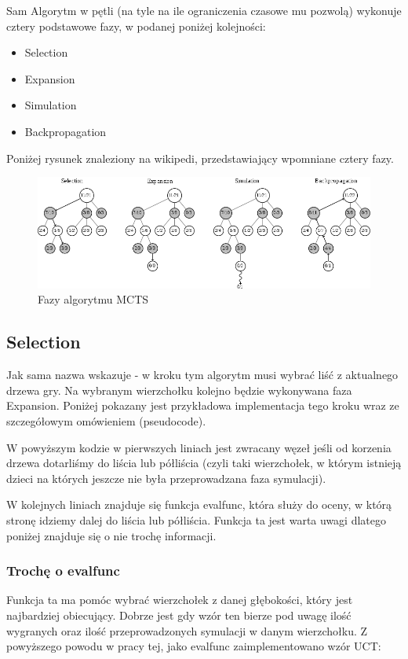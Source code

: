 \documentclass[polish,shortabstract,inz]{iithesis}
\begin{document}
Sam Algorytm w pętli (na tyle na ile ograniczenia czasowe mu pozwolą) wykonuje cztery podstawowe fazy, w podanej poniżej kolejności:
\begin{itemize}
  \item Selection
  \item Expansion
  \item Simulation
  \item Backpropagation
\end{itemize}
Poniżej rysunek znaleziony na wikipedi, przedstawiający wpomniane cztery fazy.

\begin{figure}[H]
  \includegraphics[scale=0.4]{./images/mcts.png}
  \centering
  \caption{Fazy algorytmu MCTS}
  \label{fig:mcts}
\end{figure}


\subsection{Selection}
Jak sama nazwa wskazuje - w kroku tym algorytm musi wybrać liść z aktualnego drzewa gry.
Na wybranym wierzchołku kolejno będzie wykonywana faza Expansion.
Poniżej pokazany jest przykładowa implementacja tego kroku wraz ze szczegółowym omówieniem (pseudocode).



W powyższym kodzie w pierwszych liniach jest zwracany węzeł jeśli od korzenia drzewa dotarliśmy do liścia lub półliścia (czyli taki wierzchołek, w którym istnieją dzieci na których jeszcze nie była przeprowadzana faza symulacji).

W kolejnych liniach znajduje się funkcja eval\textunderscore func, która służy do oceny, w którą stronę idziemy dalej do liścia lub półliścia.
Funkcja ta jest warta uwagi dlatego poniżej znajduje się o nie trochę informacji.

\subsubsection{Trochę o eval\textunderscore func}
Funkcja ta ma pomóc wybrać wierzchołek z danej głębokości, który jest najbardziej obiecujący.
Dobrze jest gdy wzór ten bierze pod uwagę ilość wygranych oraz ilość przeprowadzonych symulacji w danym wierzchołku.
Z powyższego powodu w pracy tej, jako eval\textunderscore func zaimplementowano wzór UCT:
\end{document}
